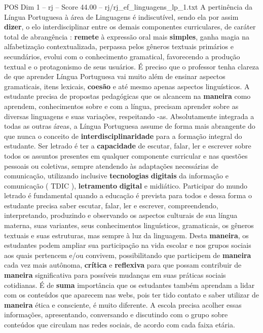 \begin{textsample}{POS Dim 1 – rj – Score 44.00 – rj/rj\_ef\_linguagens\_lp\_1.txt}
A pertinência da Língua Portuguesa à área de Linguagens é indiscutível, sendo ela por assim \textbf{dizer}, o elo interdisciplinar entre os demais componentes curriculares, de caráter total de abrangência : \textbf{remete} à expressão oral mais \textbf{simples}, ganha magia na alfabetização contextualizada, perpassa pelos gêneros textuais primários e secundários, evolui com o conhecimento gramatical, favorecendo a produção textual e o protagonismo de seus usuários.
É preciso que o professor tenha clareza de que aprender Língua Portuguesa vai muito além de ensinar aspectos gramaticais, itens lexicais, \textbf{coesão} e até mesmo apenas aspectos linguísticos.
A estudante precisa de propostas pedagógicas que os alcancem na \textbf{maneira} como aprendem, conhecimentos sobre e com a língua, precisam aprender sobre as diversas linguagens e suas variações, respeitando -as.
Absolutamente integrada a todas as outras áreas, a Língua Portuguesa assume de forma mais abrangente do que nunca o conceito de \textbf{interdisciplinaridade} para a formação integral do estudante.
Ser letrado é ter a \textbf{capacidade} de escutar, falar, ler e escrever sobre todos os assuntos presentes em qualquer componente curricular e nas questões pessoais ou coletivas, sempre atendendo às adaptações necessárias de comunicação, utilizando inclusive \textbf{tecnologias} \textbf{digitais} da informação e comunicação ( TDIC ), \textbf{letramento} \textbf{digital} e midiático.
Participar do mundo letrado é fundamental quando a educação é prevista para todos e dessa forma o estudante precisa saber escutar, falar, ler e escrever, compreendendo, interpretando, produzindo e observando os aspectos culturais de sua língua materna, suas variantes, seus conhecimentos linguísticos, gramaticais, os gêneros textuais e suas estruturas, mas sempre à luz da linguagem.
Desta \textbf{maneira}, os estudantes podem ampliar sua participação na vida escolar e nos grupos sociais aos quais pertencem e/ou convivem, possibilitando que participem de \textbf{maneira} cada vez mais autônoma, \textbf{crítica} e \textbf{reflexiva} para que possam contribuir de \textbf{maneira} significativa para possíveis mudanças em suas práticas sociais cotidianas.
É de \textbf{suma} importância que os estudantes também aprendam a lidar com os conteúdos que aparecem nas webs, pois ter tido contato e saber utilizar de \textbf{maneira} ética e consciente, é muito diferente.
A escola precisa acolher essas informações, apresentando, conversando e discutindo com o grupo sobre conteúdos que circulam nas redes sociais, de acordo com cada faixa etária.

\end{textsample}

